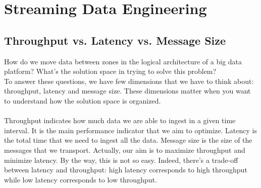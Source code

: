 \documentclass[10pt,a4paper]{article}
\newcommand{\nline}{\\~\\}
\begin{document}
\pagebreak

\section{Streaming Data Engineering}
\subsection{Throughput vs. Latency vs. Message Size}
How do we move data between zones in the logical architecture of a big data platform? What’s the solution space in trying to solve this problem?
\\
To answer these questions, we have few dimensions that we have to think about: throughput, latency and message size. These dimensions matter when you want to understand how the solution space is organized.
\nline
Throughput indicates how much data we are able to ingest in a given time interval. It is the main performance indicator that we aim to optimize. Latency is the total time that we need to ingest all the data. Message size is the size of the messages that we transport. 
Actually, our aim is to maximize throughput and minimize latency. By the way, this is not so easy. Indeed, there’s a trade-off between latency and throughput: high latency corresponds to high throughput while low latency corresponds to low throughput. 
\end{document}
